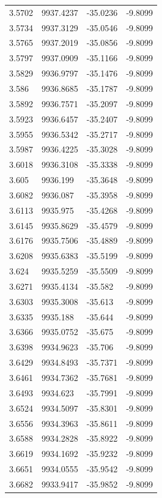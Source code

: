 \begin{table}[H]
\begin{tabular}{llll}
3.5702 & 9937.4237 & -35.0236 & -9.8099 \\
3.5734 & 9937.3129 & -35.0546 & -9.8099 \\
3.5765 & 9937.2019 & -35.0856 & -9.8099 \\
3.5797 & 9937.0909 & -35.1166 & -9.8099 \\
3.5829 & 9936.9797 & -35.1476 & -9.8099 \\
3.586 & 9936.8685 & -35.1787 & -9.8099 \\
3.5892 & 9936.7571 & -35.2097 & -9.8099 \\
3.5923 & 9936.6457 & -35.2407 & -9.8099 \\
3.5955 & 9936.5342 & -35.2717 & -9.8099 \\
3.5987 & 9936.4225 & -35.3028 & -9.8099 \\
3.6018 & 9936.3108 & -35.3338 & -9.8099 \\
3.605 & 9936.199 & -35.3648 & -9.8099 \\
3.6082 & 9936.087 & -35.3958 & -9.8099 \\
3.6113 & 9935.975 & -35.4268 & -9.8099 \\
3.6145 & 9935.8629 & -35.4579 & -9.8099 \\
3.6176 & 9935.7506 & -35.4889 & -9.8099 \\
3.6208 & 9935.6383 & -35.5199 & -9.8099 \\
3.624 & 9935.5259 & -35.5509 & -9.8099 \\
3.6271 & 9935.4134 & -35.582 & -9.8099 \\
3.6303 & 9935.3008 & -35.613 & -9.8099 \\
3.6335 & 9935.188 & -35.644 & -9.8099 \\
3.6366 & 9935.0752 & -35.675 & -9.8099 \\
3.6398 & 9934.9623 & -35.706 & -9.8099 \\
3.6429 & 9934.8493 & -35.7371 & -9.8099 \\
3.6461 & 9934.7362 & -35.7681 & -9.8099 \\
3.6493 & 9934.623 & -35.7991 & -9.8099 \\
3.6524 & 9934.5097 & -35.8301 & -9.8099 \\
3.6556 & 9934.3963 & -35.8611 & -9.8099 \\
3.6588 & 9934.2828 & -35.8922 & -9.8099 \\
3.6619 & 9934.1692 & -35.9232 & -9.8099 \\
3.6651 & 9934.0555 & -35.9542 & -9.8099 \\
3.6682 & 9933.9417 & -35.9852 & -9.8099 \\

\end{tabular}
\end{table}
